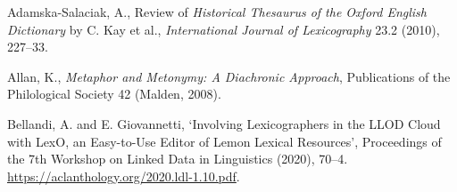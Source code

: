 \begin{list}{}%
{\leftmargin=0.5in \itemindent=-0.5in}
\setlength{\itemsep}{0pt}
\setlength{\parskip}{0pt}
\setlength{\parsep}{0pt}




\item %
Adamska-Salaciak, A., Review of \textit{Historical Thesaurus of the Oxford English Dictionary} by C. Kay et al., \textit{International Journal of Lexicography} 23.2 (2010), 227–33.


\item %
Allan, K., \textit{Metaphor and Metonymy: A Diachronic Approach}, Publications of the Philological Society 42 (Malden, 2008).



\item %
Bellandi, A. and E. Giovannetti, `Involving Lexicographers in the LLOD Cloud with LexO, an Easy-to-Use Editor of Lemon Lexical Resources', Proceedings of the 7th Workshop on Linked Data in Linguistics (2020), 70–4. \url{https://aclanthology.org/2020.ldl-1.10.pdf}.




\end{list}
